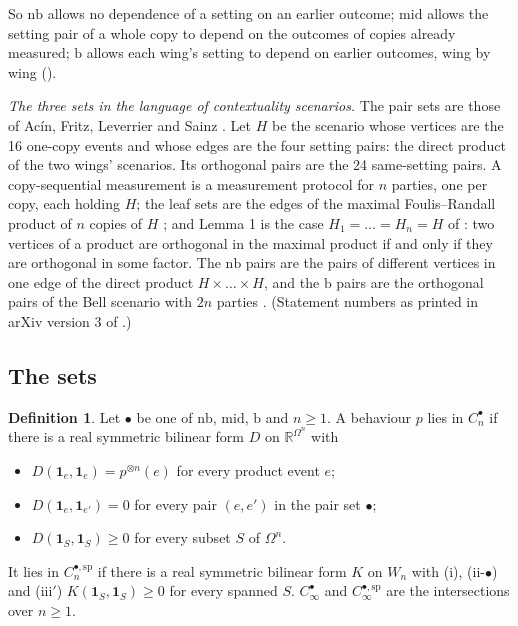 \documentclass[11pt,a4paper]{article}
\theoremstyle{definition}
\newtheorem{definition}[theorem]{Definition}
\theoremstyle{remark}
\newcommand{\ind}[1]{\mathbf{1}_{#1}}
\newcommand{\nb}{\mathrm{nb}}
\newcommand{\md}{\mathrm{mid}}
\newcommand{\br}{\mathrm{b}}
\newcommand{\ps}{\bullet}
\begin{document}
So $\nb$ allows no dependence of a setting on an earlier outcome; $\md$ allows the setting pair of a whole copy to depend on the outcomes of copies already measured; $\br$ allows each wing's setting to depend on earlier outcomes, wing by wing (\cite[Lemma 2(a)]{R7}).

\medskip
\noindent\emph{The three sets in the language of contextuality scenarios.} The pair sets are those of Ac\'in, Fritz, Leverrier and Sainz \cite{AFLS}. Let $H$ be the scenario whose vertices are the 16 one-copy events and whose edges are the four setting pairs: the direct product \cite[Definition 3.1.1]{AFLS} of the two wings' scenarios. Its orthogonal pairs are the 24 same-setting pairs. A copy-sequential measurement is a measurement protocol \cite[Definition 3.3.4]{AFLS} for $n$ parties, one per copy, each holding $H$; the leaf sets are the edges of the maximal Foulis--Randall product of $n$ copies of $H$ \cite[Definition 3.3.6]{AFLS}; and Lemma 1 is the case $H_1 = \dots = H_n = H$ of \cite[Proposition C.2.5(a)]{AFLS}: two vertices of a product are orthogonal in the maximal product if and only if they are orthogonal in some factor. The $\nb$ pairs are the pairs of different vertices in one edge of the direct product $H \times \dots \times H$, and the $\br$ pairs are the orthogonal pairs of the Bell scenario with $2n$ parties \cite[Lemma 7.2.1]{AFLS}. (Statement numbers as printed in arXiv version 3 of \cite{AFLS}.)

\subsection{The sets}

\begin{definition}\label{d:sets}
Let $\ps$ be one of $\nb$, $\md$, $\br$ and $n \ge 1$. A behaviour $p$ lies in $C_n^{\ps}$ if there is a real symmetric bilinear form $D$ on $\mathbb{R}^{\Omega^n}$ with
\begin{itemize}
  \item[(i)] $D(\ind{e}, \ind{e}) = p^{\otimes n}(e)$ for every product event $e$;
  \item[(ii-$\ps$)] $D(\ind{e}, \ind{e'}) = 0$ for every pair $(e, e')$ in the pair set $\ps$;
  \item[(iii)] $D(\ind{S}, \ind{S}) \ge 0$ for every subset $S$ of $\Omega^n$.
\end{itemize}
It lies in $C_n^{\ps,\mathrm{sp}}$ if there is a real symmetric bilinear form $K$ on $W_n$ with (i), (ii-$\ps$) and (iii$'$) $K(\ind{S}, \ind{S}) \ge 0$ for every spanned $S$. $C_\infty^{\ps}$ and $C_\infty^{\ps,\mathrm{sp}}$ are the intersections over $n \ge 1$.
\end{definition}
\end{document}

